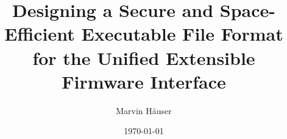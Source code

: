     \title{Designing a Secure and Space-Efficient Executable File Format for the Unified Extensible Firmware Interface}

    \author{Marvin H{\"a}user}

    \date{\today}

    \newcommand{\examinerA}{Prof. Dr. rer. nat. Klaus Schneider}
    \newcommand{\examinerB}{Julius Roob, M.Sc.}

    \newcommand{\thesisType}{Master}